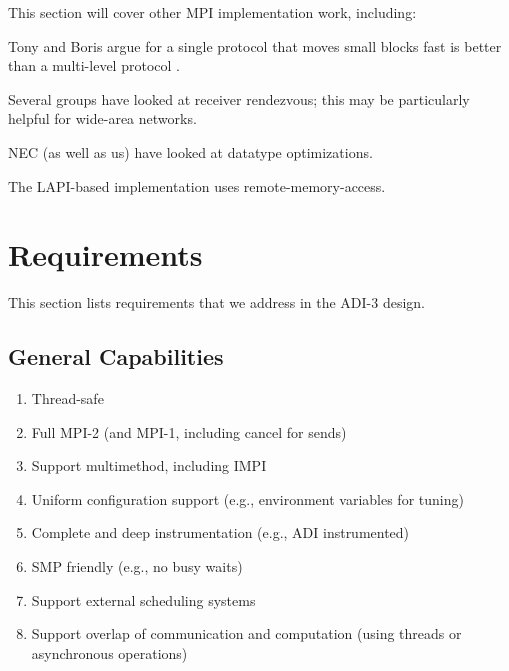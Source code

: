 \documentclass{article}
\begin{document}
This section will cover other MPI implementation work, including:

Tony and Boris argue for a single protocol that moves small blocks fast is
better than a multi-level protocol \cite{techreport}.

Several groups have looked at receiver rendezvous; this may be particularly
helpful for wide-area networks.

NEC (as well as us) have looked at datatype optimizations.

The LAPI-based implementation uses remote-memory-access.

\section{Requirements}
This section lists requirements that we address in the ADI-3 design.

\subsection{General Capabilities}
\begin{enumerate}
\item Thread-safe
\item Full MPI-2 (and MPI-1, including cancel for sends)
\item Support multimethod, including IMPI
\item Uniform configuration support (e.g., environment variables for tuning)
\item Complete and deep instrumentation (e.g., ADI instrumented)
\item SMP friendly (e.g., no busy waits)
\item Support external scheduling systems
\item Support overlap of communication and computation (using threads or
  asynchronous operations)
\end{enumerate}
\end{document}
